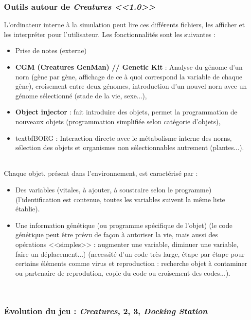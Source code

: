 \documentclass[11pt,twoside,a4paper]{article}
\begin{document}
\subsubsection{Outils autour de \textit{Creatures <<1.0>>}}

L'ordinateur interne {\`a} la simulation peut lire ces diff{\'e}rents fichiers, les afficher et les interpr{\'e}ter pour l'utilisateur. Les fonctionnalit{\'e}s sont les suivantes :
\begin{itemize}
	\item Prise de notes (externe)
	\item \textbf{CGM (Creatures GenMan) // Genetic Kit} : Analyse du g{\'e}nome d'un norn (g{\`e}ne par g{\`e}ne, affichage de ce {\`a} quoi correspond la variable de chaque g{\`e}ne), croisement entre deux g{\'e}nomes, introduction d'un nouvel norn avec un g{\'e}nome s{\'e}lectionn{\'e} (stade de la vie, sexe...), 
	\item \textbf{Object injector} : fait introduire des objets, permet la programmation de nouveaux objets (programmation simplifi{\'e}e selon cat{\'e}gorie d'objets), 
	\item textbf{BORG} : Interaction directe avec le m{\'e}tabolisme interne des norns, s{\'e}lection des objets et organismes non s{\'e}lectionnables autrement (plantes...). 
\end{itemize}~\\

Chaque objet, pr{\'e}sent dans l'environnement, est caract{\'e}ris{\'e} par :
\begin{itemize}
	\item Des variables (vitales, {\`a} ajouter, {\`a} soustraire selon le programme) (l'identification est contenue, toutes les variables suivent la m{\^e}me liste {\'e}tablie). 
	\item Une information g{\'e}n{\'e}tique (ou programme sp{\'e}cifique de l'objet) (le code g{\'e}n{\'e}tique peut {\^e}tre pr{\'e}vu de fa\c{c}on {\`a} autoriser la vie, mais aussi des op{\'e}rations <<simples>> : augmenter une variable, diminuer une variable, faire un d{\'e}placement...) (necessit{\'e} d'un code tr{\`e}s large, {\'e}tape par {\'e}tape pour certains {\'e}l{\'e}ments comme virus et reproduction : recherche objet {\`a} contaminer ou partenaire de reprodution, copie du code ou croisement des codes...). 
\end{itemize}~\\

\subsubsection{{\'E}volution du jeu : \textit{Creatures}, 2, 3, \textit{Docking Station}}
\end{document}
